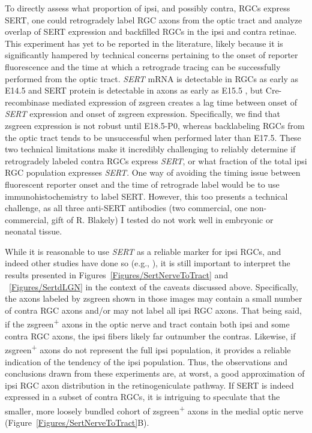 To directly assess what proportion of ipsi, and possibly contra, RGCs express SERT, one could retrogradely label RGC axons from the optic tract and analyze overlap of SERT expression and backfilled RGCs in the ipsi and contra retinae.
This experiment has yet to be reported in the literature, likely because it is significantly hampered by technical concerns pertaining to the onset of reporter fluorescence and the time at which a retrograde tracing can be successfully performed from the optic tract.
\emph{SERT} mRNA is detectable in RGCs as early as E14.5 \cite{garcia2010zic2} and SERT protein is detectable in axons as early as E15.5 \cite{upton1999excess}, but Cre-recombinase mediated expression of zsgreen creates a lag time between onset of \emph{SERT} expression and onset of zsgreen expression.
Specifically, we find that zsgreen expression is not robust until E18.5-P0, whereas backlabeling RGCs from the optic tract tends to be unsuccessful when performed later than E17.5.
These two technical limitations make it incredibly challenging to reliably determine if retrogradely labeled contra RGCs express \emph{SERT}, or what fraction of the total ipsi RGC population expresses \emph{SERT}.
One way of avoiding the timing issue between fluorescent reporter onset and the time of retrograde label would be to use immunohistochemistry to label SERT.
However, this too presents a technical challenge, as all three anti-SERT antibodies (two commercial, one non-commercial, gift of R. Blakely) I tested do not work well in embryonic or neonatal tissue.

While it is reasonable to use \emph{SERT} as a reliable marker for ipsi RGCs, and indeed other studies have done so (e.g., ), it is still important to interpret the results presented in Figures~\ref{Figures/SertNerveToTract} and ~\ref{Figures/SertdLGN} in the context of the caveats discussed above. 
Specifically, the axons labeled by zsgreen shown in those images may contain a small number of contra RGC axons and/or may not label all ipsi RGC axons.
That being said, if the zsgreen\textsuperscript{+} axons in the optic nerve and tract contain both ipsi and some contra RGC axons, the ipsi fibers likely far outnumber the contras. 
Likewise, if zsgreen\textsuperscript{+} axons do not represent the full ipsi population, it provides a reliable indication of the tendency of the ipsi population.
Thus, the observations and conclusions drawn from these experiments are, at worst, a good approximation of ipsi RGC axon distribution in the retinogeniculate pathway.
If SERT is indeed expressed in a subset of contra RGCs, it is intriguing to speculate that the smaller, more loosely bundled cohort of zsgreen\textsuperscript{+} axons in the medial optic nerve (Figure~\ref{Figures/SertNerveToTract}B).

